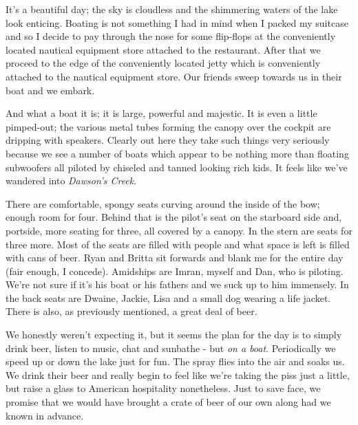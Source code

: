 \documentclass[a5paper,titlepage,11pt]{book}
\begin{document}
It's a beautiful day; the sky is cloudless and the shimmering waters of the lake look enticing. Boating is not something I had in mind when I packed my suitcase and so I decide to pay through the nose for some flip-flops at the conveniently located nautical equipment store attached to the restaurant. After that we proceed to the edge of the conveniently located jetty which is conveniently attached to the nautical equipment store. Our friends sweep towards us in their boat and we embark.


And what a boat it is; it is large, powerful and majestic. It is even a little pimped-out; the various metal tubes forming the canopy over the cockpit are dripping with speakers. Clearly out here they take such things very seriously because we see a number of boats which appear to be nothing more than floating subwoofers all piloted by chiseled and tanned looking rich kids. It feels like we've wandered into \emph{Dawson's Creek}.

There are comfortable, spongy seats curving around the inside of the bow; enough room for four. Behind that is the pilot's seat on the starboard side and, portside, more seating for three, all covered by a canopy. In the stern are seats for three more. Most of the seats are filled with people and what space is left is filled with cans of beer. Ryan and Britta sit forwards and blank me for the entire day (fair enough, I concede). Amidships are Imran, myself and Dan, who is piloting. We're not sure if it's his boat or his fathers and we suck up to him immensely. In the back seats are Dwaine, Jackie, Lisa and a small dog wearing a life jacket. There is also, as previously mentioned, a great deal of beer.

We honestly weren't expecting it, but it seems the plan for the day is to simply drink beer, listen to music, chat and sunbathe - but \emph{on a boat}. Periodically we speed up or down the lake just for fun. The spray flies into the air and soaks us. We drink their beer and really begin to feel like we're taking the piss just a little, but raise a glass to American hospitality nonetheless. Just to save face, we promise that we would have brought a crate of beer of our own along had we known in advance.

\end{document}
